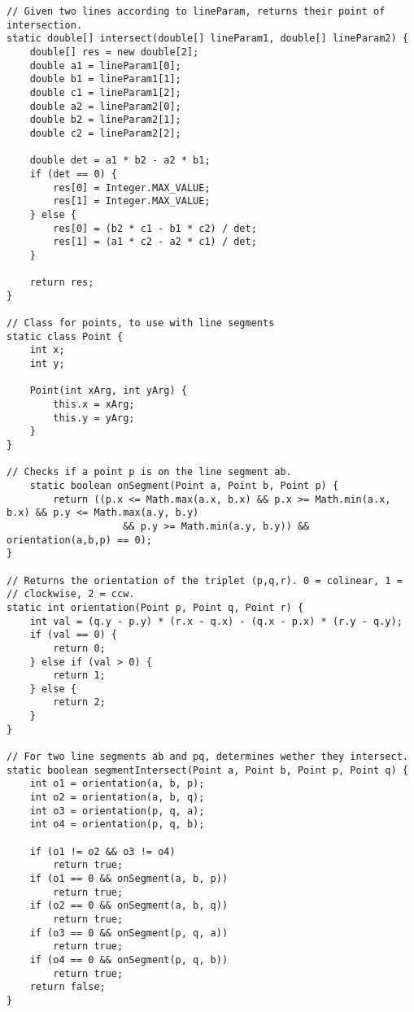 \begin{verbatim}
// Given two lines according to lineParam, returns their point of intersection.
static double[] intersect(double[] lineParam1, double[] lineParam2) {
	double[] res = new double[2];
	double a1 = lineParam1[0];
	double b1 = lineParam1[1];
	double c1 = lineParam1[2];
	double a2 = lineParam2[0];
	double b2 = lineParam2[1];
	double c2 = lineParam2[2];

	double det = a1 * b2 - a2 * b1;
	if (det == 0) {
		res[0] = Integer.MAX_VALUE;
		res[1] = Integer.MAX_VALUE;
	} else {
		res[0] = (b2 * c1 - b1 * c2) / det;
		res[1] = (a1 * c2 - a2 * c1) / det;
	}

	return res;
}

// Class for points, to use with line segments
static class Point {
	int x;
	int y;

	Point(int xArg, int yArg) {
		this.x = xArg;
		this.y = yArg;
	}
}

// Checks if a point p is on the line segment ab.
	static boolean onSegment(Point a, Point b, Point p) {
		return ((p.x <= Math.max(a.x, b.x) && p.x >= Math.min(a.x, b.x) && p.y <= Math.max(a.y, b.y)
					&& p.y >= Math.min(a.y, b.y)) && orientation(a,b,p) == 0);
}

// Returns the orientation of the triplet (p,q,r). 0 = colinear, 1 =
// clockwise, 2 = ccw.
static int orientation(Point p, Point q, Point r) {
	int val = (q.y - p.y) * (r.x - q.x) - (q.x - p.x) * (r.y - q.y);
	if (val == 0) {
		return 0;
	} else if (val > 0) {
		return 1;
	} else {
		return 2;
	}
}

// For two line segments ab and pq, determines wether they intersect.
static boolean segmentIntersect(Point a, Point b, Point p, Point q) {
	int o1 = orientation(a, b, p);
	int o2 = orientation(a, b, q);
	int o3 = orientation(p, q, a);
	int o4 = orientation(p, q, b);

	if (o1 != o2 && o3 != o4)
		return true;
	if (o1 == 0 && onSegment(a, b, p))
		return true;
	if (o2 == 0 && onSegment(a, b, q))
		return true;
	if (o3 == 0 && onSegment(p, q, a))
		return true;
	if (o4 == 0 && onSegment(p, q, b))
		return true;
	return false;
}
\end{verbatim}